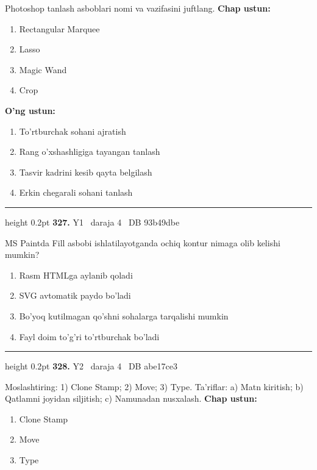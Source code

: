 \documentclass[10pt,a4paper,oneside]{article}
\begin{document}
Photoshop tanlash asboblari nomi va vazifasini juftlang.
\textbf{\footnotesize Chap ustun:}
\begin{enumerate}[label=\arabic*),leftmargin=9mm]
\item Rectangular Marquee
\item Lasso
\item Magic Wand
\item Crop
\end{enumerate}
\textbf{\footnotesize O'ng ustun:}
\begin{enumerate}[label=\Alph*),leftmargin=9mm]
\item To'rtburchak sohani ajratish
\item Rang o'xshashligiga tayangan tanlash
\item Tasvir kadrini kesib qayta belgilash
\item Erkin chegarali sohani tanlash
\end{enumerate}
\vspace{2mm}\hrule height 0.2pt \vspace{4mm}
\hypertarget{q327}{\textbf{\color{ink}327.}}  {\color{muted}\scriptsize Y1 \textbullet\ daraja 4 \textbullet\ DB 93b49dbe}
\par
MS Paintda Fill asbobi ishlatilayotganda ochiq kontur nimaga olib kelishi mumkin?
\begin{enumerate}[label=\Alph*),leftmargin=9mm]
\item Rasm HTMLga aylanib qoladi
\item SVG avtomatik paydo bo'ladi
\item Bo'yoq kutilmagan qo'shni sohalarga tarqalishi mumkin
\item Fayl doim to'g'ri to'rtburchak bo'ladi
\end{enumerate}
\vspace{2mm}\hrule height 0.2pt \vspace{4mm}
\hypertarget{q328}{\textbf{\color{ink}328.}}  {\color{muted}\scriptsize Y2 \textbullet\ daraja 4 \textbullet\ DB abe17ce3}
\par
Moslashtiring: 1) Clone Stamp; 2) Move; 3) Type. Ta'riflar: a) Matn kiritish; b) Qatlamni joyidan siljitish; c) Namunadan nusxalash.
\textbf{\footnotesize Chap ustun:}
\begin{enumerate}[label=\arabic*),leftmargin=9mm]
\item Clone Stamp
\item Move
\item Type
\end{enumerate}
\end{document}
